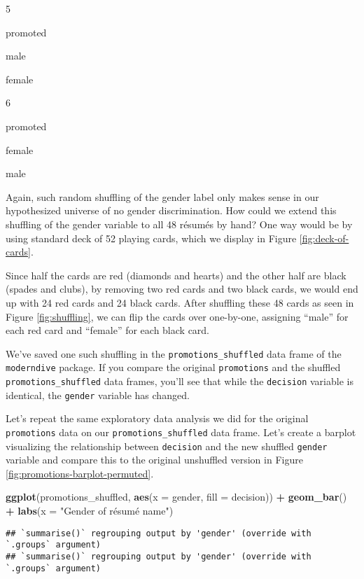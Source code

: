 \documentclass[
]{book}
\newenvironment{Shaded}{\begin{snugshade}}{\end{snugshade}}
\newcommand{\DataTypeTok}[1]{\textcolor[rgb]{0.13,0.29,0.53}{#1}}
\newcommand{\KeywordTok}[1]{\textcolor[rgb]{0.13,0.29,0.53}{\textbf{#1}}}
\newcommand{\NormalTok}[1]{#1}
\newcommand{\OperatorTok}[1]{\textcolor[rgb]{0.81,0.36,0.00}{\textbf{#1}}}
\newcommand{\StringTok}[1]{\textcolor[rgb]{0.31,0.60,0.02}{#1}}
\begin{document}
5

promoted

male

female

6

promoted

female

male

Again, such random shuffling of the gender label only makes sense in our hypothesized universe of no gender discrimination. How could we extend this shuffling of the gender variable to all 48 résumés by hand? One way would be by using standard deck of 52 playing cards, which we display in Figure \ref{fig:deck-of-cards}.

Since half the cards are red (diamonds and hearts) and the other half are black (spades and clubs), by removing two red cards and two black cards, we would end up with 24 red cards and 24 black cards. After shuffling these 48 cards as seen in Figure \ref{fig:shuffling}, we can flip the cards over one-by-one, assigning ``male'' for each red card and ``female'' for each black card.

We've saved one such shuffling in the \texttt{promotions\_shuffled} data frame of the \texttt{moderndive} package. If you compare the original \texttt{promotions} and the shuffled \texttt{promotions\_shuffled} data frames, you'll see that while the \texttt{decision} variable is identical, the \texttt{gender} variable has changed.

Let's repeat the same exploratory data analysis we did for the original \texttt{promotions} data on our \texttt{promotions\_shuffled} data frame. Let's create a barplot visualizing the relationship between \texttt{decision} and the new shuffled \texttt{gender} variable and compare this to the original unshuffled version in Figure \ref{fig:promotions-barplot-permuted}.

\begin{Shaded}
\begin{Highlighting}[]
\KeywordTok{ggplot}\NormalTok{(promotions_shuffled, }
       \KeywordTok{aes}\NormalTok{(}\DataTypeTok{x =}\NormalTok{ gender, }\DataTypeTok{fill =}\NormalTok{ decision)) }\OperatorTok{+}
\StringTok{  }\KeywordTok{geom_bar}\NormalTok{() }\OperatorTok{+}\StringTok{ }
\StringTok{  }\KeywordTok{labs}\NormalTok{(}\DataTypeTok{x =} \StringTok{"Gender of résumé name"}\NormalTok{)}
\end{Highlighting}
\end{Shaded}

\begin{verbatim}
## `summarise()` regrouping output by 'gender' (override with `.groups` argument)
## `summarise()` regrouping output by 'gender' (override with `.groups` argument)
\end{verbatim}
\end{document}
